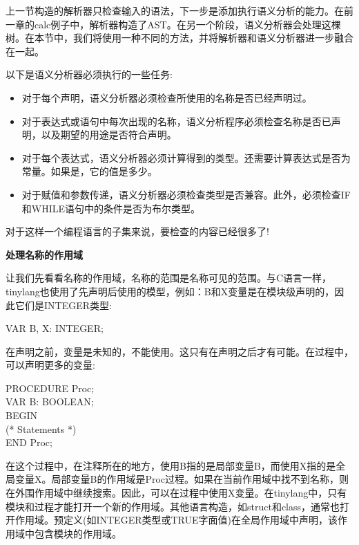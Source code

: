上一节构造的解析器只检查输入的语法，下一步是添加执行语义分析的能力。在前一章的calc例子中，解析器构造了AST。在另一个阶段，语义分析器会处理这棵树。在本节中，我们将使用一种不同的方法，并将解析器和语义分析器进一步融合在一起。\par

以下是语义分析器必须执行的一些任务:\par

\begin{itemize}
\item 对于每个声明，语义分析器必须检查所使用的名称是否已经声明过。
\item 对于表达式或语句中每次出现的名称，语义分析程序必须检查名称是否已声明，以及期望的用途是否符合声明。
\item 对于每个表达式，语义分析器必须计算得到的类型。还需要计算表达式是否为常量。如果是，它的值是多少。
\item 对于赋值和参数传递，语义分析器必须检查类型是否兼容。此外，必须检查IF和WHILE语句中的条件是否为布尔类型。
\end{itemize}

对于这样一个编程语言的子集来说，要检查的内容已经很多了!\par

\hspace*{\fill} \par %
\textbf{处理名称的作用域}

让我们先看看名称的作用域，名称的范围是名称可见的范围。与C语言一样，tinylang也使用了先声明后使用的模型，例如：B和X变量是在模块级声明的，因此它们是INTEGER类型:\par

\begin{tcolorbox}[colback=white,colframe=black]
VAR B, X: INTEGER;
\end{tcolorbox}

在声明之前，变量是未知的，不能使用。这只有在声明之后才有可能。在过程中，可以声明更多的变量:\par

\begin{tcolorbox}[colback=white,colframe=black]
PROCEDURE Proc; \\
VAR B: BOOLEAN; \\
BEGIN \\
\hspace*{0.5cm}(* Statements *)\\
END Proc;
\end{tcolorbox}

在这个过程中，在注释所在的地方，使用B指的是局部变量B，而使用X指的是全局变量X。局部变量B的作用域是Proc过程。如果在当前作用域中找不到名称，则在外围作用域中继续搜索。因此，可以在过程中使用X变量。在tinylang中，只有模块和过程才能打开一个新的作用域。其他语言构造，如struct和class，通常也打开作用域。预定义(如INTEGER类型或TRUE字面值)在全局作用域中声明，该作用域中包含模块的作用域。\par

